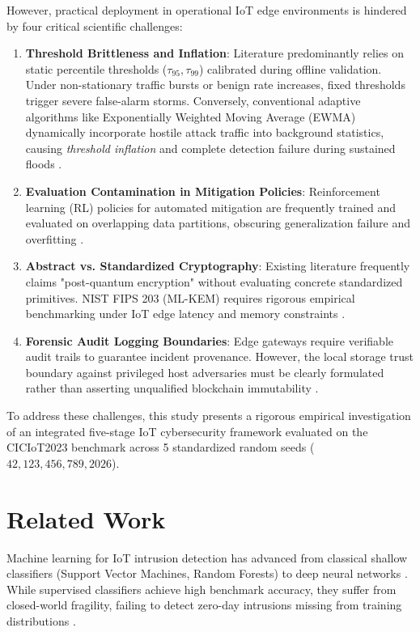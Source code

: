 \documentclass{ieeeaccess}
\begin{document}
However, practical deployment in operational IoT edge environments is hindered by four critical scientific challenges:
\begin{enumerate}
    \item \textbf{Threshold Brittleness and Inflation}: Literature predominantly relies on static percentile thresholds ($\tau_{95}, \tau_{99}$) calibrated during offline validation. Under non-stationary traffic bursts or benign rate increases, fixed thresholds trigger severe false-alarm storms. Conversely, conventional adaptive algorithms like Exponentially Weighted Moving Average (EWMA) dynamically incorporate hostile attack traffic into background statistics, causing \textit{threshold inflation} and complete detection failure during sustained floods \cite{siffer2017,ahmad2017}.
    \item \textbf{Evaluation Contamination in Mitigation Policies}: Reinforcement learning (RL) policies for automated mitigation are frequently trained and evaluated on overlapping data partitions, obscuring generalization failure and overfitting \cite{sutton2018,dulac2019}.
    \item \textbf{Abstract vs. Standardized Cryptography}: Existing literature frequently claims "post-quantum encryption" without evaluating concrete standardized primitives. NIST FIPS 203 (ML-KEM) requires rigorous empirical benchmarking under IoT edge latency and memory constraints \cite{nist2024fips203,albrecht2018}.
    \item \textbf{Forensic Audit Logging Boundaries}: Edge gateways require verifiable audit trails to guarantee incident provenance. However, the local storage trust boundary against privileged host adversaries must be clearly formulated rather than asserting unqualified blockchain immutability \cite{haber1991,bellare1996}.
\end{enumerate}

To address these challenges, this study presents a rigorous empirical investigation of an integrated five-stage IoT cybersecurity framework evaluated on the CICIoT2023 benchmark \cite{neto2023} across 5 standardized random seeds ($42, 123, 456, 789, 2026$).

\section{Related Work}
\label{sec:related_work}
Machine learning for IoT intrusion detection has advanced from classical shallow classifiers (Support Vector Machines, Random Forests) to deep neural networks \cite{moustafa2019,sarhan2023}. While supervised classifiers achieve high benchmark accuracy, they suffer from closed-world fragility, failing to detect zero-day intrusions missing from training distributions \cite{sommer2010,apruzzese2023}.
\end{document}
